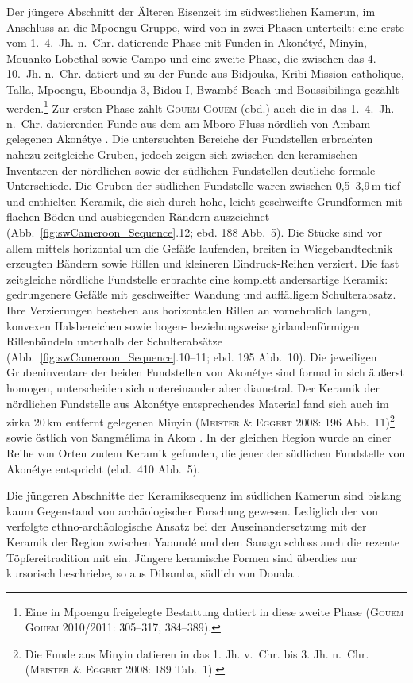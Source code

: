 Der jüngere Abschnitt der Älteren Eisenzeit im südwestlichen Kamerun, im Anschluss an die Mpoengu-Gruppe, wird von \textcite[379\,f.]{GouemGouem.20102011} in zwei Phasen unterteilt: eine erste vom 1.--4.~Jh. n.~Chr. datierende Phase mit Funden in Akonétyé, Minyin, Mouanko-Lobethal sowie Campo und eine zweite Phase, die zwischen das 4.--10.~Jh. n.~Chr. datiert und zu der Funde aus Bidjouka, Kribi-Mission catholique, Talla, Mpoengu, Eboundja 3, Bidou I, Bwambé Beach und Boussibilinga gezählt werden.\footnote{Eine in Mpoengu freigelegte Bestattung datiert in diese zweite Phase (\textsc{Gouem Gouem} 2010/2011: 305--317, 384--389).} Zur ersten Phase zählt \textsc{Gouem Gouem} (ebd.) auch die in das 1.--4.~Jh. n.~Chr. datierenden Funde aus dem am Mboro-Fluss nördlich von Ambam gelegenen Akonétye \parencite[184]{Meister.2008b}. Die untersuchten Bereiche der Fundstellen erbrachten nahezu zeitgleiche Gruben, jedoch zeigen sich zwischen den keramischen Inventaren der nördlichen sowie der südlichen Fundstellen deutliche formale Unterschiede. Die Gruben der südlichen Fundstelle waren zwischen 0,5--3,9\,m tief und enthielten Keramik, die sich durch hohe, leicht geschweifte Grundformen mit flachen Böden und ausbiegenden Rändern auszeichnet (Abb.~\ref{fig:swCameroon_Sequence}.12; ebd. 188 Abb.~5). Die Stücke sind vor allem mittels horizontal um die Gefäße laufenden, breiten in Wiegebandtechnik erzeugten Bändern sowie Rillen und kleineren Eindruck-Reihen verziert. Die fast zeitgleiche nördliche Fundstelle erbrachte eine komplett andersartige Keramik: gedrungenere Gefäße mit geschweifter Wandung und auffälligem Schulterabsatz. Ihre Verzierungen bestehen aus horizontalen Rillen an vornehmlich langen, konvexen Halsbereichen sowie bogen- beziehungsweise girlandenförmigen Rillenbündeln unterhalb der Schulterabsätze (Abb.~\ref{fig:swCameroon_Sequence}.10--11; ebd. 195 Abb.~10). Die jeweiligen Grubeninventare der beiden Fundstellen von Akonétye sind formal in sich äußerst homogen, unterscheiden sich untereinander aber diametral. Der Keramik der nördlichen Fundstelle aus Akonétye entsprechendes Material fand sich auch im zirka 20\,km entfernt gelegenen Minyin (\textsc{Meister \& Eggert} 2008: 196 Abb.~11)\footnote{Die Funde aus Minyin datieren in das 1. Jh. v.~Chr. bis 3. Jh. n.~Chr. (\textsc{Meister \& Eggert} 2008: 189 Tab.~1).} sowie östlich von Sangmélima in Akom \parencite[413 Abb.~6.1,10]{deSaulieu.2015}. In der gleichen Region wurde an einer Reihe von Orten zudem Keramik gefunden, die jener der südlichen Fundstelle von Akonétye entspricht (ebd.~410 Abb.~5).

Die jüngeren Abschnitte der Keramiksequenz im südlichen Kamerun sind bislang kaum Gegenstand von archäologischer Forschung gewesen. Lediglich der von \textcite{Elouga.20002001} verfolgte ethno-archäologische Ansatz bei der Auseinandersetzung mit der Keramik der Region zwischen Yaoundé und dem Sanaga schloss auch die rezente Töpfereitradition mit ein. Jüngere keramische Formen sind überdies nur kursorisch beschriebe, so aus Dibamba, südlich von Douala \parencite{Saulieu.2017}.